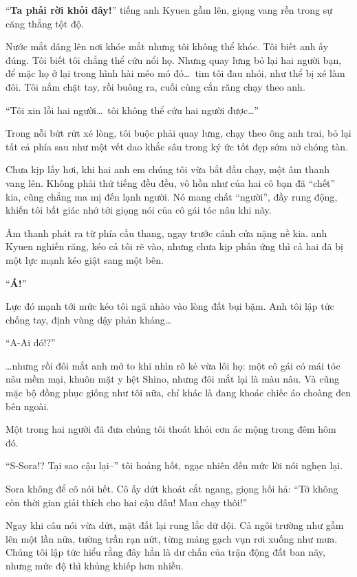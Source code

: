 \documentclass[../main.tex]{subfiles}
\begin{document}
``\textbf{Ta phải rời khỏi đây!}'' tiếng anh Kyuen gầm lên, giọng vang rền trong sự căng thẳng tột độ.

Nước mắt dâng lên nơi khóe mắt nhưng tôi không thể khóc. Tôi biết anh ấy đúng. Tôi biết tôi chẳng thể cứu nổi họ. Nhưng quay lưng bỏ lại hai người bạn, để mặc họ ở lại trong hình hài méo mó đó\dots\ tim tôi đau nhói, như thể bị xé làm đôi. Tôi nắm chặt tay, rồi buông ra, cuối cùng cắn răng chạy theo anh.

``Tôi xin lỗi hai người\dots\ tôi không thể cứu hai người được\dots''

Trong nỗi bứt rứt xé lòng, tôi buộc phải quay lưng, chạy theo ông anh trai, bỏ lại tất cả phía sau như một vết dao khắc sâu trong ký ức tốt đẹp sớm nở chóng tàn.

\ct

Chưa kịp lấy hơi, khi hai anh em chúng tôi vừa bắt đầu chạy, một âm thanh vang lên. Không phải thứ tiếng đều đều, vô hồn như của hai cô bạn đã ``chết'' kia, cũng chẳng ma mị đến lạnh người. Nó mang chất ``người'', đầy rung động, khiến tôi bất giác nhớ tới giọng nói của cô gái tóc nâu khi nãy.

Âm thanh phát ra từ phía cầu thang, ngay trước cánh cửa nặng nề kia. anh Kyuen nghiến răng, kéo cả tôi rẽ vào, nhưng chưa kịp phản ứng thì cả hai đã bị một lực mạnh kéo giật sang một bên.

``\textbf{Á!}''

Lực đó mạnh tới mức kéo tôi ngã nhào vào lòng đất bụi bặm. Anh tôi lập tức chống tay, định vùng dậy phản kháng\dots

``A-Ai đó!?''

\dots nhưng rồi đôi mắt anh mở to khi nhìn rõ kẻ vừa lôi họ: một cô gái có mái tóc nâu mềm mại, khuôn mặt y hệt Shino, nhưng đôi mắt lại là màu nâu. Và cũng mặc bộ đồng phục giống như tôi nữa, chỉ khác là đang khoác chiếc áo choàng đen bên ngoài.

Một trong hai người đã đưa chúng tôi thoát khỏi cơn ác mộng trong đêm hôm đó.

``S-Sora!? Tại sao cậu lại--'' tôi hoảng hốt, ngạc nhiên đến mức lời nói nghẹn lại.

Sora không để cô nói hết. Cô ấy dứt khoát cắt ngang, giọng hối hả: ``Tớ không còn thời gian giải thích cho hai cậu đâu! Mau chạy thôi!''

Ngay khi câu nói vừa dứt, mặt đất lại rung lắc dữ dội. Cả ngôi trường như gầm lên một lần nữa, tường trần rạn nứt, từng mảng gạch vụn rơi xuống như mưa. Chúng tôi lập tức hiểu rằng đây hẳn là dư chấn của trận động đất ban nãy, nhưng mức độ thì khủng khiếp hơn nhiều.
\end{document}
